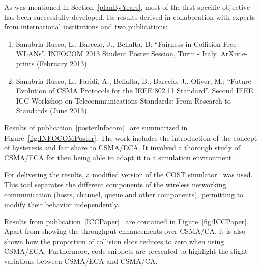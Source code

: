As was mentioned in Section~\ref{planByYears}, most of the first specific objective has been successfully developed. Its results derived in collaboration with experts from international institutions and two publications:

\begin{enumerate}
	\item Sanabria-Russo, L., Barcelo, J., Bellalta, B: ``Fairness in Collision-Free WLANs''. INFOCOM 2013 Student Poster Session, Turin - Italy. ArXiv e-prints (February 2013).\label{posterInfocom}
	\item Sanabria-Russo, L., Faridi, A., Bellalta, B., Barcelo, J., Oliver, M.: ``Future Evolution of CSMA Protocols for the IEEE 802.11 Standard''. Second IEEE ICC Workshop on Telecommunications Standards: From Research to Standards (June 2013).\label{ICCPaper}
\end{enumerate}

Results of publication~\ref{posterInfocom}~\cite{fairness-ECA} are summarized in Figure~\ref{fig:INFOCOMPoster}. The work includes the introduction of the concept of hysteresis and fair share to CSMA/ECA. It involved a thorough study of CSMA/ECA for then being able to adapt it to a simulation environment. 

For delivering the results, a modified version of the COST simulator~\cite{COST} was used. This tool separates the different components of the wireless networking communication (hosts, channel, queue and other components), permitting to modify their behavior independently.

Results from publication~\ref{ICCPaper}~\cite{research2standards} are contained in Figure~\ref{fig:ICCPaper}. Apart from showing the throughput enhancements over CSMA/CA, it is also shown how the proportion of collision slots reduces to zero when using CSMA/ECA. Furthermore, code snippets are presented to highlight the slight variations between CSMA/ECA and CSMA/CA.

